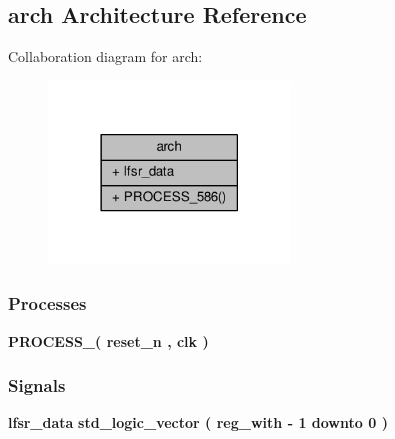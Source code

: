 \subsection{arch Architecture Reference}
\label{classLFSR_1_1arch}


Collaboration diagram for arch\+:\nopagebreak
\begin{figure}[H]
\begin{center}
\leavevmode
\includegraphics[width=182pt]{d2/da1/classLFSR_1_1arch__coll__graph}
\end{center}
\end{figure}
\subsubsection*{Processes}
 \begin{DoxyCompactItemize}
\item 
{\bf P\+R\+O\+C\+E\+S\+S\+\_}{\bfseries  ( {\bfseries {\bfseries {\bf reset\+\_\+n}} \textcolor{vhdlchar}{ }} , {\bfseries {\bfseries {\bf clk}} \textcolor{vhdlchar}{ }} )}
\end{DoxyCompactItemize}
\subsubsection*{Signals}
 \begin{DoxyCompactItemize}
\item 
{\bf lfsr\+\_\+data} {\bfseries \textcolor{comment}{std\+\_\+logic\+\_\+vector}\textcolor{vhdlchar}{ }\textcolor{vhdlchar}{(}\textcolor{vhdlchar}{ }\textcolor{vhdlchar}{ }\textcolor{vhdlchar}{ }\textcolor{vhdlchar}{ }{\bfseries {\bf reg\+\_\+with}} \textcolor{vhdlchar}{-\/}\textcolor{vhdlchar}{ } \textcolor{vhdldigit}{1} \textcolor{vhdlchar}{ }\textcolor{keywordflow}{downto}\textcolor{vhdlchar}{ }\textcolor{vhdlchar}{ } \textcolor{vhdldigit}{0} \textcolor{vhdlchar}{ }\textcolor{vhdlchar}{)}\textcolor{vhdlchar}{ }} 
\end{DoxyCompactItemize}


